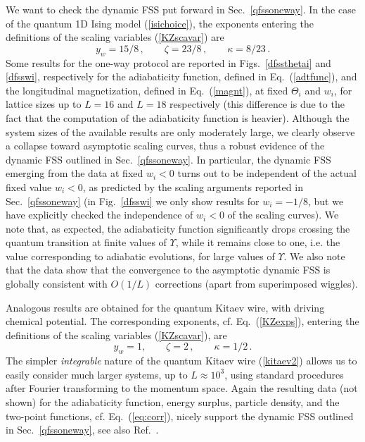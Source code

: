 We want to check the dynamic FSS put forward in Sec.~\ref{qfssoneway}.
In the case of the quantum 1D Ising model (\ref{isichoice}), the
exponents entering the definitions of the scaling variables
(\ref{KZscavar}) are 
\begin{equation}
y_w = 15/8\,,\qquad \zeta = 23/8\,,
\qquad \kappa = 8/23\,.
\label{qisiexps}
\end{equation}
Some results for the one-way protocol are reported in
Figs.~\ref{dfssthetai} and \ref{dfsswi}, respectively for the
adiabaticity function, defined in Eq.~(\ref{adtfunc}), and the
longitudinal magnetization, defined in Eq.~(\ref{magnt}), at fixed
$\Theta_i$ and $w_i$, for lattice sizes up to $L=16$ and $L=18$
respectively (this difference is due to the fact that the computation
of the adiabaticity function is heavier).  Although the system sizes
of the available results are only moderately large, we clearly observe
a collapse toward asymptotic scaling curves, thus a robust evidence of
the dynamic FSS outlined in Sec.~\ref{qfssoneway}.  In particular, the
dynamic FSS emerging from the data at fixed $w_i<0$ turns out to be
independent of the actual fixed value $w_i<0$, as predicted by the
scaling arguments reported in Sec.~\ref{qfssoneway} (in
Fig.~\ref{dfsswi} we only show results for $w_i=-1/8$, but we have
explicitly checked the independence of $w_i<0$ of the scaling
curves). We note that, as expected, the adiabaticity function
significantly drops crossing the quantum transition at finite values
of $\Upsilon$, while it remains close to one, i.e. the value
corresponding to adiabatic evolutions, for large values of $\Upsilon$.
We also  note that the data show that the convergence to the
asymptotic dynamic FSS is globally consistent with $O(1/L)$
corrections (apart from superimposed wiggles).


Analogous results are obtained for the quantum Kitaev wire, with
driving chemical potential.  The corresponding exponents,
cf. Eq.~(\ref{KZexps}), entering the definitions of the scaling
variables (\ref{KZscavar}), are
\begin{equation}
y_w = 1, \qquad \zeta = 2\,,\qquad \kappa =
1/2\,.
\label{kexps}
\end{equation}
The simpler {\em integrable} nature of the quantum Kitaev wire
(\ref{kitaev2}) allows us to easily consider much larger systems, up
to $L\approx 10^3$, using standard procedures after Fourier
transforming to the momentum space. Again the resulting data (not
shown) for the adiabaticity function, energy surplus, particle
density, and the two-point functions, cf. Eq.~(\ref{eq:corr}), nicely
support the dynamic FSS outlined in Sec.~\ref{qfssoneway}, see also
Ref.~\cite{rossini2021coherent}.



